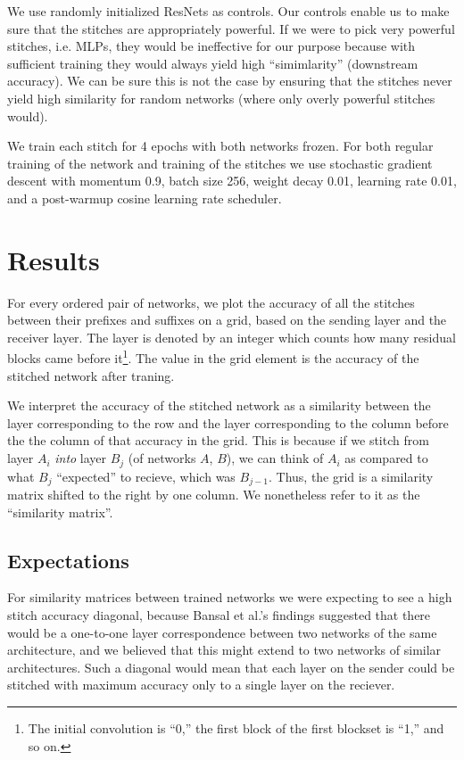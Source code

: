 \documentclass{article} %
\begin{document}
We use randomly initialized ResNets as controls. Our controls enable us to make sure that
the stitches are appropriately powerful. If we were to pick very powerful stitches, i.e. MLPs,
they would be ineffective for our purpose because with sufficient training they would always yield
high ``simimlarity'' (downstream accuracy). We can be sure this is not the case by ensuring that
the stitches never yield high similarity for random networks (where only overly powerful stitches
would).

We train each stitch for 4 epochs with both networks frozen. For both
regular training of the network and training of the stitches we use stochastic gradient descent with momentum 0.9,
batch size 256, weight decay 0.01, learning rate 0.01, and a post-warmup cosine learning rate scheduler.

\section{Results}
\label{Results}
For every ordered pair of networks, we plot the accuracy of all the stitches between their prefixes and suffixes
on a grid, based on the sending layer and the receiver layer. The layer is
denoted by an integer which counts how many residual blocks came before it\footnote{
   The initial convolution is ``0,'' the first block of the first blockset is ``1,'' and so on.
}. The value in the grid element is the accuracy of the stitched network after traning.

We interpret the accuracy of the stitched network as a similarity between the layer corresponding to
the row and the layer corresponding to the column before the the column of that accuracy in the grid.
This is because if we stitch from layer $A_i$ \textit{into} layer $B_j$ (of networks $A$, $B$),
we can think of $A_i$ as compared to what $B_j$ ``expected'' to recieve, which was $B_{j-1}$. Thus,
the grid is a similarity matrix shifted to the right by one column.  We nonetheless refer to it as the
``similarity matrix''.

\subsection*{Expectations}
For similarity matrices between trained networks we were expecting to see a high stitch accuracy diagonal, because
Bansal et al.'s findings suggested that there would be a one-to-one layer correspondence between
two networks of the same architecture, and we believed that this might extend to two networks of similar architectures.
Such a diagonal would mean that each layer on the sender could be stitched with maximum accuracy 
only to a single layer on the reciever.
\end{document}
